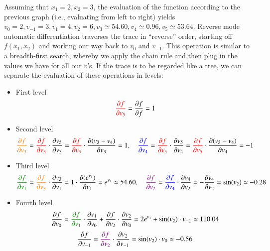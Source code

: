 \documentclass[12pt]{report} %
\newcommand{\tmcolor}[2]{{\color{#1}{#2}}}
\begin{document}
Assuming that $x_1 = 2, x_2 = 3$, the evaluation of the function according to
the previous graph (i.e., evaluating from left to right) yields $v_0 = 2, v_{-
1} = 3, v_1 = 4, v_2 = 6, v_3 \simeq 54.60, v_4 \simeq 0.96, v_5 \simeq
53.64$. Reverse mode automatic differentiation traverses the trace in
``reverse'' order, starting off $f (x_1, x_2)$ and working our way back to
$v_0$ and $v_{- 1}$. This operation is similar to a breadth-first search,
whereby we apply the chain rule and then plug in the values we have for all
our $v$'s. If the trace is to be regarded like a tree, we can separate the
evaluation of these operations in levels:
\begin{itemize}
  \item First level
  \[ \tmcolor{red}{\frac{\partial f}{\partial v_5}} = \frac{\partial
     f}{\partial f} = 1 \]
  \item Second level
  \[ \tmcolor{orange}{\frac{\partial f}{\partial v_3}} =
     \tmcolor{red}{\frac{\partial f}{\partial v_5}} \cdot \frac{\partial
     v_5}{\partial v_3} = \tmcolor{red}{\frac{\partial f}{\partial v_5}} \cdot
     \frac{\partial (v_3 - v_4)}{\partial v_3} = 1, \quad
     \tmcolor{blue}{\frac{\partial f}{\partial v_4}} =
     \tmcolor{red}{\frac{\partial f}{\partial v_5}} \cdot \frac{\partial
     v_5}{\partial v_4} = \tmcolor{red}{\frac{\partial f}{\partial v_5}} \cdot
     \frac{\partial (v_3 - v_4)}{\partial v_4} = - 1 \]
  \item Third level
  \[ {\color[HTML]{008000}\frac{\partial f}{\partial v_1}} =
     \tmcolor{orange}{\frac{\partial f}{\partial v_3}} \cdot \frac{\partial
     v_3}{\partial v_1} = 1 \cdot \frac{\partial (e^{v_1})}{\partial v_1} =
     e^{v_1} \simeq 54.60, \quad {\color[HTML]{800080}\frac{\partial
     f}{\partial v_2}} = \tmcolor{blue}{\frac{\partial f}{\partial v_4}} \cdot
     \frac{\partial v_4}{\partial v_2} = - \frac{\partial v_4}{\partial v_2} =
     \sin (v_2) \simeq - 0.28 \]
  \item Fourth level
  \[ \frac{\partial f}{\partial v_0} = {\color[HTML]{008000}\frac{\partial
     f}{\partial v_1}} \cdot \frac{\partial v_1}{\partial v_0} +
     \frac{\partial f}{\partial v_2} \cdot \frac{\partial v_2}{\partial v_0} =
     2 e^{v_1} + \sin (v_2) \cdot v_{- 1} \simeq 110.04 \]
  \[ \frac{\partial f}{\partial v_{- 1}} = {\color[HTML]{800080}\frac{\partial
     f}{\partial v_2}} \cdot \frac{\partial v_2}{\partial v_{- 1}} = \sin
     (v_2) \cdot v_0 \simeq - 0.56 \]
\end{itemize}
\end{document}
